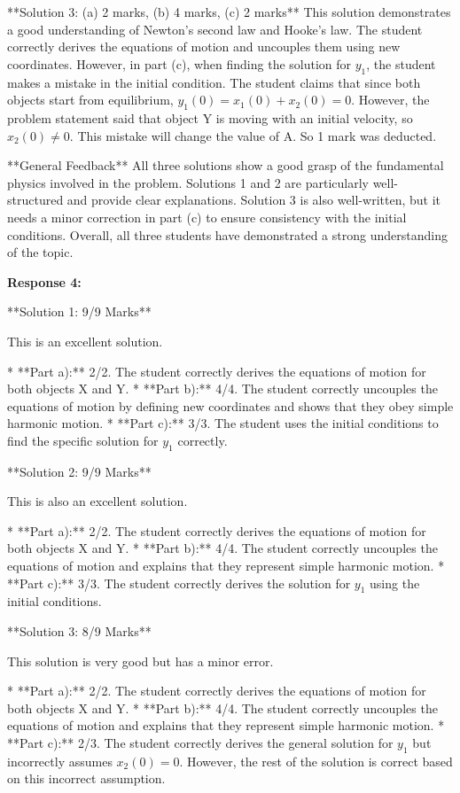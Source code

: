 \documentclass[a4paper,11pt]{article}
\begin{document}
**Solution 3: (a) 2 marks, (b) 4 marks, (c) 2 marks**
This solution demonstrates a good understanding of Newton's second law and Hooke's law. The student correctly derives the equations of motion and uncouples them using new coordinates. However, in part (c), when finding the solution for \( y_1 \), the student makes a mistake in the initial condition. The student claims that since both objects start from equilibrium, $y_1(0) = x_1(0) + x_2(0) = 0$. However, the problem statement said that object Y is moving with an initial velocity, so $x_2(0) \neq 0$. This mistake will change the value of A. So 1 mark was deducted. 

**General Feedback**
All three solutions show a good grasp of the fundamental physics involved in the problem. Solutions 1 and 2 are particularly well-structured and provide clear explanations. Solution 3 is also well-written, but it needs a minor correction in part (c) to ensure consistency with the initial conditions. Overall, all three students have demonstrated a strong understanding of the topic.

\textbf{Response 4:}

**Solution 1: 9/9 Marks**

This is an excellent solution. 

*   **Part a):** 2/2. The student correctly derives the equations of motion for both objects X and Y.
*   **Part b):** 4/4. The student correctly uncouples the equations of motion by defining new coordinates and shows that they obey simple harmonic motion.
*   **Part c):** 3/3. The student uses the initial conditions to find the specific solution for \(y_1\) correctly.

**Solution 2: 9/9 Marks**

This is also an excellent solution.

*   **Part a):** 2/2. The student correctly derives the equations of motion for both objects X and Y.
*   **Part b):** 4/4. The student correctly uncouples the equations of motion and explains that they represent simple harmonic motion.
*   **Part c):** 3/3. The student correctly derives the solution for \(y_1\) using the initial conditions.

**Solution 3: 8/9 Marks**

This solution is very good but has a minor error.

*   **Part a):** 2/2. The student correctly derives the equations of motion for both objects X and Y.
*   **Part b):** 4/4. The student correctly uncouples the equations of motion and explains that they represent simple harmonic motion.
*   **Part c):** 2/3. The student correctly derives the general solution for \(y_1\) but incorrectly assumes \(x_2(0) = 0\). However, the rest of the solution is correct based on this incorrect assumption.
\end{document}
